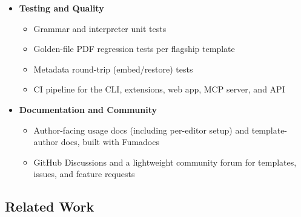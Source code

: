 \documentclass[a4paper,twoside]{article}
\begin{document}
\begin{itemize}[leftmargin=*]
  \item \textbf{Testing and Quality}
    \begin{itemize}
      \item Grammar and interpreter unit tests
      \item Golden-file PDF regression tests per flagship template
      \item Metadata round-trip (embed/restore) tests
      \item CI pipeline for the CLI, extensions, web app, MCP server, and API
    \end{itemize}

  \item \textbf{Documentation and Community}
    \begin{itemize}
      \item Author-facing usage docs (including per-editor setup) and template-author docs, built with Fumadocs
      \item GitHub Discussions and a lightweight community forum for templates, issues, and feature requests
    \end{itemize}
\end{itemize}

\subsection{Related Work}
\end{document}
